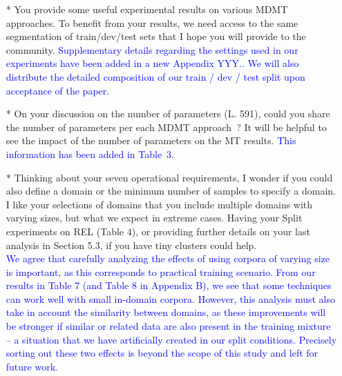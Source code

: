 \documentclass[12pt,times,a4paper,twoside]{article}
\newcommand{\fyTodo}[1]{\Todo[FY:]{\textcolor{orange}{#1}}}
\theoremstyle{definition}
\begin{document}
\begin{itemize}
\item[*] You provide some useful experimental results on various MDMT approaches. To benefit from your results, we need access to the same segmentation of train/dev/test sets that I hope you will provide to the community.
\textcolor{blue}{Supplementary details regarding the settings used in our experiments have been added in a new Appendix YYY.\fyTodo{Fix the appendix.}. We will also distribute the detailed composition of our train / dev / test split upon acceptance of the paper.}
\\
\item[*] On your discussion on the number of parameters (L. 591), could you share the number of parameters per each MDMT approach~? It will be helpful to see  the impact of the number of parameters on the MT results.
  \textcolor{blue}{This information has been added in Table~3\fyTodo{Check number, page and line number and content}.}
\\ 
\item[*] Thinking about your seven operational requirements, I wonder if you could also define a domain or the minimum number of samples to specify a domain. I like your selections of domains that you include multiple domains with varying sizes, but what we expect in extreme cases. Having your Split experiments on REL (Table 4), or providing further details on your last analysis in Section 5.3, if you have tiny clusters could help.\fyTodo{Answer this with more experiments ?}
  \\
  \textcolor{blue}{We agree that carefully analyzing the effects of using corpora of varying size is important, as this corresponds to practical training scenario. From our results in Table 7 (and Table 8 in Appendix B), we see that some techniques can work well with small in-domain corpora. However, this analysis must also take in account the similarity between domains, as these improvements will be stronger if similar or related data are also present in the training mixture -- a situation that we have artificially created in our split conditions. Precisely sorting out these two effects is beyond the scope of this study and left for future work.}
  

\end{itemize}
\end{document}
